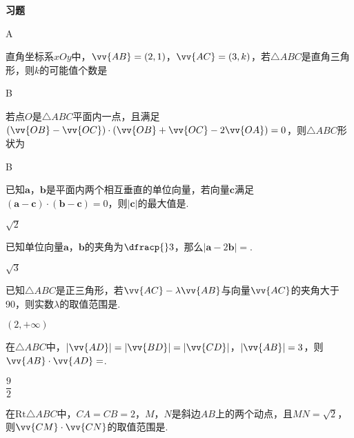 \begin{exercise}{\textbf{习题}}
\begin{answer}
      A
    \end{answer}
  \item%
    直角坐标系$xOy$中，$\vv{AB}=(2,1)$，$\vv{AC}=(3,k)$，若$\triangle{ABC}$是直角三角形，则$k$的可能值个数是\xz
    \begin{answer}
      B
    \end{answer}
  \item%
    若点$O$是$\triangle{ABC}$平面内一点，且满足$(\vv{OB}-\vv{OC})\cdot(\vv{OB}+\vv{OC}-2\vv{OA})=0$，则$\triangle{ABC}$形状为\xz
    \begin{answer}
      B
    \end{answer}
  \item%
    已知$\bm a$，$\bm b$是平面内两个相互垂直的单位向量，若向量$\bm c$满足$(\bm a-\bm c)\cdot(\bm b-\bm c)=0$，则$|\bm c|$的最大值是\tk.
    \begin{answer}
      $\sqrt2$
    \end{answer}
  \item%
    已知单位向量$\bm a$，$\bm b$的夹角为$\dfracp{}3$，那么$|\bm a-2\bm b|=$\tk.
    \begin{answer}
      $\sqrt3$
    \end{answer}
  \item%
    已知$\triangle{ABC}$是正三角形，若$\vv{AC}-\lambda\vv{AB}$与向量$\vv{AC}$的夹角大于90\degree，则实数$\lambda$的取值范围是\tk.
    \begin{answer}
      $(2,+\infty)$
    \end{answer}
  \item%
    在$\triangle{ABC}$中，$|\vv{AD}|=|\vv{BD}|=|\vv{CD}|$，$|\vv{AB}|=3$，则$\vv{AB}\cdot\vv{AD}=$\tk.
    \begin{answer}
      $\dfrac92$
    \end{answer}
  \item%
    在$\mathrm{Rt}\triangle{ABC}$中，$CA=CB=2$，$M$，$N$是斜边$AB$上的两个动点，且$MN=\sqrt{2}$，则$\vv{CM}\cdot\vv{CN}$的取值范围是\tk.

\end{exercise}
